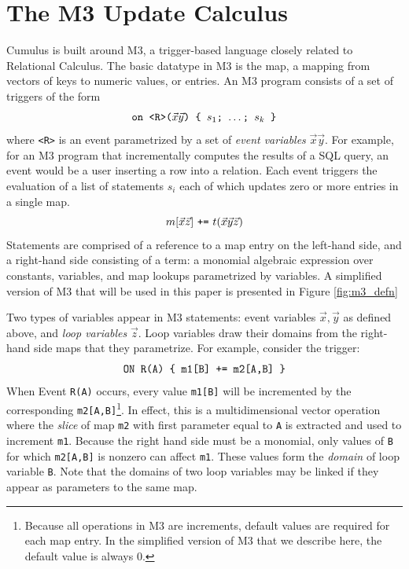 \documentclass{vldb}
\begin{document}
\section{The M3 Update Calculus}
Cumulus is built around M3, a trigger-based language closely related to Relational Calculus.  The basic datatype in M3 is the map, a mapping from vectors of keys to numeric values, or entries.  An M3 program consists of a set of triggers of the form
\[
\mbox{{\tt on <R>($\vec x \vec y$) \{ $s_1$; $\dots$; $s_k$ \}}}
\]
where {\tt <R>} is an event parametrized by a set of \textit{event variables} $\vec x \vec y$.  For example, for an M3 program that incrementally computes the results of a SQL query, an event would be a user inserting a row into a relation.  Each event triggers the evaluation of a list of statements $s_i$ each of which updates zero or more entries in a single map.
\[
\mbox{$m[\vec{x}\vec{z}]$ {\tt +=} $t(\vec x \vec y \vec z)$}
\]
Statements are comprised of a reference to a map entry on the left-hand side, and a right-hand side consisting of a term: a monomial algebraic expression over constants, variables, and map lookups parametrized by variables.  A simplified version of M3 that will be used in this paper is presented in Figure \ref{fig:m3_defn}

Two types of variables appear in M3 statements: event variables $\vec x, \vec y$ as defined above, and \textit{loop variables} $\vec z$.  Loop variables draw their domains from the right-hand side maps that they parametrize.  For example, consider the trigger:
\[
\mbox{\texttt{ON R(A) \{ m1[B] += m2[A,B] \}}}
\]
When Event \texttt{R(A)} occurs, every value \texttt{m1[B]} will be incremented by the corresponding \texttt{m2[A,B]}\footnote{Because all operations in M3 are increments, default values are required for each map entry.  In the simplified version of M3 that we describe here, the default value is always 0.}.  In effect, this is a multidimensional vector operation where the \textit{slice} of map \texttt{m2} with first parameter equal to \texttt{A} is extracted and used to increment \texttt{m1}.  Because the right hand side must be a monomial, only values of \texttt{B} for which \texttt{m2[A,B]} is nonzero can affect \texttt{m1}.  These values form the \textit{domain} of loop variable \texttt{B}.  Note that the domains of two loop variables may be linked if they appear as parameters to the same map.

\end{document}
